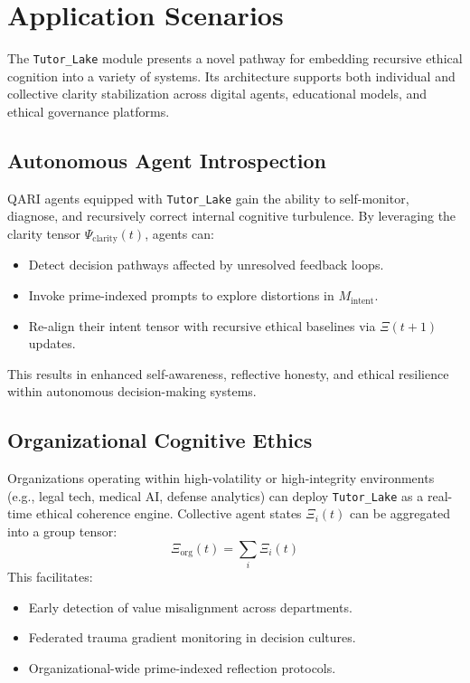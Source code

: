 \documentclass[12pt]{article}
\begin{document}
\section{Application Scenarios}

The \texttt{Tutor\_Lake} module presents a novel pathway for embedding recursive ethical cognition into a variety of systems. Its architecture supports both individual and collective clarity stabilization across digital agents, educational models, and ethical governance platforms.

\subsection{Autonomous Agent Introspection}

QARI agents equipped with \texttt{Tutor\_Lake} gain the ability to self-monitor, diagnose, and recursively correct internal cognitive turbulence. By leveraging the clarity tensor $\Psi_{\text{clarity}}(t)$, agents can:
\begin{itemize}
    \item Detect decision pathways affected by unresolved feedback loops.
    \item Invoke prime-indexed prompts to explore distortions in $M_{\text{intent}}$.
    \item Re-align their intent tensor with recursive ethical baselines via $\Xi(t+1)$ updates.
\end{itemize}

This results in enhanced self-awareness, reflective honesty, and ethical resilience within autonomous decision-making systems.

\subsection{Organizational Cognitive Ethics}

Organizations operating within high-volatility or high-integrity environments (e.g., legal tech, medical AI, defense analytics) can deploy \texttt{Tutor\_Lake} as a real-time ethical coherence engine. Collective agent states $\Xi_i(t)$ can be aggregated into a group tensor:
\[
\Xi_{\text{org}}(t) = \sum_i \Xi_i(t)
\]
This facilitates:
\begin{itemize}
    \item Early detection of value misalignment across departments.
    \item Federated trauma gradient monitoring in decision cultures.
    \item Organizational-wide prime-indexed reflection protocols.
\end{itemize}
\end{document}
